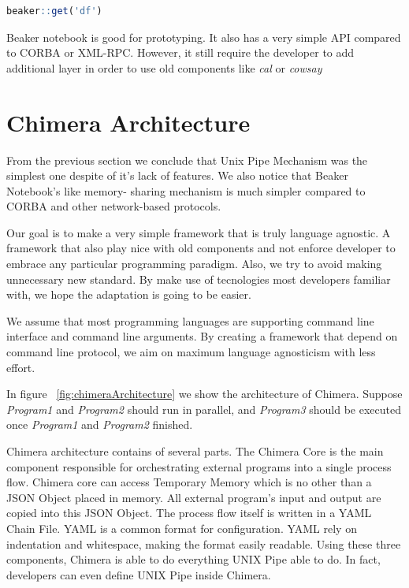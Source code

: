 \documentclass[conference]{IEEEtran}
\begin{document}
\begin{lstlisting}[caption=Beaker R Cell Example, label=beakerR, language=R, basicstyle=\small, breaklines=true]
beaker::get('df')
\end{lstlisting}

Beaker notebook is good for prototyping. It also has a very simple API compared to
CORBA or XML-RPC. However, it still require the developer to add additional layer
in order to use old components like {\it cal} or {\it cowsay}


\section{Chimera Architecture}

From the previous section we conclude that Unix Pipe Mechanism was the simplest one
despite of it's lack of features. We also notice that Beaker Notebook's like memory-
sharing mechanism is much simpler compared to CORBA and other network-based protocols.

Our goal is to make a very simple framework that is truly language agnostic. A framework
that also play nice with old components and not enforce developer to embrace any 
particular programming paradigm. Also, we try to avoid making unnecessary new standard.
By make use of tecnologies most developers familiar with, we hope the adaptation is
going to be easier.

We assume that most programming languages are supporting command line interface and
command line arguments. By creating a framework that depend on command line protocol,
we aim on maximum language agnosticism with less effort.

In figure ~\ref{fig:chimeraArchitecture} we show the architecture of Chimera. Suppose
{\it Program1} and {\it Program2} should run in parallel, and {\it Program3} should be
executed once {\it Program1} and {\it Program2} finished.

Chimera architecture contains of several parts. The Chimera Core is the main component 
responsible for orchestrating external programs into a single process flow. 
Chimera core can access Temporary Memory which is no other than a JSON Object placed in
memory. All external program's input and output are copied into this JSON Object.
The process flow itself is written in a YAML Chain File. YAML is a common format for
configuration. YAML rely on indentation and whitespace, making the format easily 
readable. Using these three components, Chimera is able to do everything UNIX Pipe
able to do. In fact, developers can even define UNIX Pipe inside Chimera.
\end{document}

